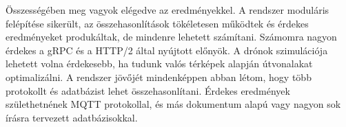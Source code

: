 
Összességében meg vagyok elégedve az eredményekkel.
A rendszer moduláris felépítése sikerült, az összehasonlítások tökéletesen működtek és érdekes eredményeket produkáltak, de mindenre lehetett számítani.
Számomra nagyon érdekes a gRPC és a HTTP/2 által nyújtott előnyök.
A drónok szimulációja lehetett volna érdekesebb, ha tudunk valós térképek alapján útvonalakat optimalizálni.
A rendszer jövőjét mindenképpen abban létom, hogy több protokollt és adatbázist lehet összehasonlítani.
Érdekes eredmények születhetnének MQTT protokollal, és más dokumentum alapú vagy nagyon sok írásra tervezett adatbázisokkal.

